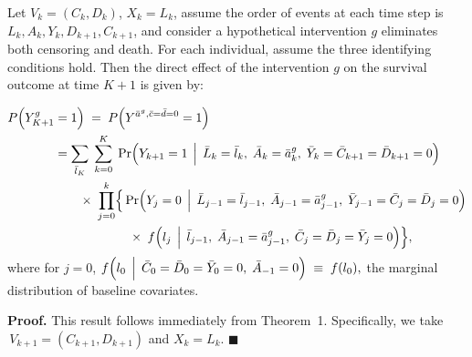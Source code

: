 \begin{tcolorbox}[title=Corollary 1: Direct effect under elimination of death and censoring]
    \label{cor:direct-effect-time-varying}
    
  Let $V_k = (C_k,D_k)$, $X_k = L_k$, 
  assume the order of events at each time step is $L_k, A_k, Y_k, D_{k+1}, C_{k+1}$,
  and consider a hypothetical intervention $g$ 
  eliminates both censoring and death. 
  For each individual, assume the three identifying 
  conditions hold. Then the direct effect of the intervention $g$ on the survival outcome at time $K+1$ is given by:

  
  \begin{align*}
      P\Bigl(Y_{K+1}^g &= 1\Bigr) \;=\;
      P\Bigl(Y^{\bar{a}^g,\bar{c}=\bar{d}=0} = 1\Bigr) \\
      & = \sum_{\bar{l}_K} \; \sum_{k=0}^{K}\;
      \Pr\Bigl(Y_{k+1} = 1 \,\Bigm|\,
              \bar{L}_k=\bar{l}_k,\;\bar{A}_k=\bar{a}^g_k,\;
              \bar{Y}_k = \bar{C}_{k+1}=\bar{D}_{k+1}=0\Bigr)
      \\
      & \qquad \times \;
      \prod_{j=0}^{k}
      \Bigl\{\,
        \Pr\Bigl(Y_j=0 \,\Bigm|\,
                \bar{L}_{j-1}=\bar{l}_{j-1},\;\bar{A}_{j-1}=\bar{a}^g_{j-1},\;
                \bar{Y}_{j-1} = 
                \bar{C}_j=\bar{D}_j=0\Bigr)
      \\
      &\qquad\qquad\qquad \times\;
        f\Bigl(l_j \,\Bigm|\,
                  \bar{l}_{j-1},\;\bar{A}_{j-1}=\bar{a}^g_{j-1},\;
                  \bar{C}_j=\bar{D}_j=\bar{Y}_j=0\Bigr)
      \Bigr\},
  \end{align*}  
    where for \(j=0\),  
    \(
    f\Bigl(l_0 \,\Bigm|\,
       \bar{C}_0 = \bar{D}_0 = \bar{Y}_0=0,\; \bar{A}_{-1}=0\Bigr)
      \;\equiv\;
    f(l_0),
    \)
    the marginal distribution of baseline covariates.
    
    \end{tcolorbox}
    
    \noindent
    \textbf{Proof.}
    This result follows immediately from Theorem~1.  Specifically, we take
    \(\,V_{k+1} = (C_{k+1}, D_{k+1})\)
    and
    \(X_k = L_k\).
    \(\blacksquare\)
    